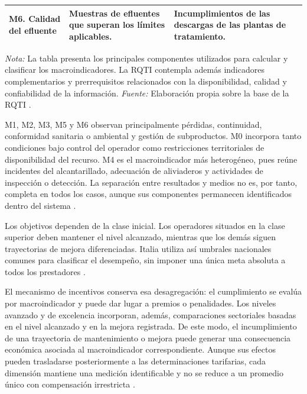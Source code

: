 \begin{table}[!t]
\begin{tabularx}{\textwidth}{
>{\raggedright\arraybackslash}p{2.65cm}
>{\raggedright\arraybackslash}p{5.55cm}
>{\raggedright\arraybackslash}X}
\textbf{M6. Calidad del efluente}
&
Muestras de efluentes que superan los límites aplicables.
&
Incumplimientos de las descargas de las plantas de tratamiento.
\\
\hline
\end{tabularx}

\begin{minipage}{\textwidth}
\footnotesize
\textit{Nota:} La tabla presenta los principales componentes utilizados para calcular y clasificar los macroindicadores. La RQTI contempla además indicadores complementarios y prerrequisitos relacionados con la disponibilidad, calidad y confiabilidad de la información. \textit{Fuente:} Elaboración propia sobre la base de la RQTI \citep{ARERA2017RQTI,ARERA2023RQTI}.
\end{minipage}
\end{table}

M1, M2, M3, M5 y M6 observan principalmente pérdidas, continuidad, conformidad sanitaria o ambiental y gestión de subproductos. M0 incorpora tanto condiciones bajo control del operador como restricciones territoriales de disponibilidad del recurso. M4 es el macroindicador más heterogéneo, pues reúne incidentes del alcantarillado, adecuación de aliviaderos y actividades de inspección o detección. La separación entre resultados y medios no es, por tanto, completa en todos los casos, aunque sus componentes permanecen identificados dentro del sistema \citep{ARERA2017RQTI,ARERA2023RQTI}.

Los objetivos dependen de la clase inicial. Los operadores situados en la clase superior deben mantener el nivel alcanzado, mientras que los demás siguen trayectorias de mejora diferenciadas. Italia utiliza así umbrales nacionales comunes para clasificar el desempeño, sin imponer una única meta absoluta a todos los prestadores \citep{ARERA2017RQTI,ARERA2023RQTI}.

El mecanismo de incentivos conserva esa desagregación: el cumplimiento se evalúa por macroindicador y puede dar lugar a premios o penalidades. Los niveles avanzado y de excelencia incorporan, además, comparaciones sectoriales basadas en el nivel alcanzado y en la mejora registrada. De este modo, el incumplimiento de una trayectoria de mantenimiento o mejora puede generar una consecuencia económica asociada al macroindicador correspondiente. Aunque sus efectos pueden trasladarse posteriormente a las determinaciones tarifarias, cada dimensión mantiene una medición identificable y no se reduce a un promedio único con compensación irrestricta \citep{ARERA2023RQTI,ARERA2023MTI4}.

